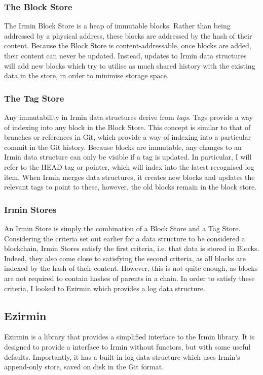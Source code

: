 \documentclass[12pt,a4paper,twoside,openright]{report}
\begin{document}
	\subsubsection*{The Block Store}
	The Irmin Block Store is a heap of immutable blocks. 
	Rather than being addressed by a physical address, these blocks are addressed by the hash of their content.
	Because the Block Store is content-addressable, once blocks are added, their content can never be updated.
	Instead, updates to Irmin data structures will add new blocks which try to utilise as much shared history with the existing data in the store, in order to minimise storage space.
	\subsubsection*{The Tag Store}
	Any immutability in Irmin data structures derive from \textit{tags}.
	Tags provide a way of indexing into any block in the Block Store.
	This concept is similar to that of branches or references in Git, which provide a way of indexing into a particular commit in the Git history.
	Because blocks are immutable, any changes to an Irmin data structure can only be visible if a tag is updated. 
	In particular, I will refer to the HEAD tag or pointer, which will index into the latest recognised log item.
	When Irmin merges data structures, it creates new blocks and updates the relevant tags to point to these, however, the old blocks remain in the block store.
	\subsubsection*{Irmin Stores}
	An Irmin Store is simply the combination of a Block Store and a Tag Store.
	Considering the criteria set out earlier for a data structure to be considered a blockchain, Irmin Stores satisfy the first criteria, i.e. that data is stored in Blocks.
	Indeed, they also come close to satisfying the second criteria, as all blocks are indexed by the hash of their content. 
	However, this is not quite enough, as blocks are not required to contain hashes of parents in a chain.
	In order to satisfy these criteria, I looked to Ezirmin which provides a log data structure.

	\subsection{Ezirmin}
	Ezirmin is a library that provides a simplified interface to the Irmin library. 
	It is designed to provide a interface to Irmin without functors, but with some useful defaults. 
	Importantly, it has a built in log data structure which uses Irmin's append-only store, saved on disk in the Git format.
\end{document}
